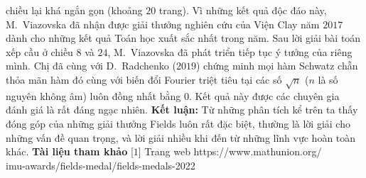 \begin{multicols}{2}
chiều lại khá ngắn gọn (khoảng $20$ trang). Vì những kết quả độc đáo này, M.~Viazovska đã nhận được giải thưởng nghiên cứu của Viện Clay năm $2017$ dành cho những kết quả Toán học xuất sắc nhất trong năm.        
	\vskip 0.05cm
	Sau lời giải bài toán xếp cầu ở chiều $8$ và $24$, M.~Viazovska đã phát triển tiếp tục ý tưởng của riêng mình. Chị đã cùng với D.~Radchenko ($2019$) chứng minh mọi hàm Schwatz chẵn thỏa mãn hàm đó cùng với biến đổi Fourier triệt tiêu tại các số $\sqrt{n}$ ($n$ là số nguyên không âm) luôn đồng nhất bằng $0$. Kết quả này được các chuyên gia đánh giá là rất đáng ngạc nhiên.
	\vskip 0.05cm
	{\bf\color{duongvaotoanhoc} Kết luận:}  Từ những phân tích kể trên ta thấy đóng góp của những giải thưởng Fields luôn rất đặc biệt, thường là lời giải cho những vấn đề quan trọng, và lời giải nhiều khi đến từ những lĩnh vực hoàn toàn khác.
	\vskip 0.05cm
	\textbf{\color{duongvaotoanhoc}Tài liệu tham khảo}
	\vskip 0.05cm
	[$1$] Trang web {\color{duongvaotoanhoc}https://www.mathunion.org/\\imu-awards/fields-medal/fields-medals-2022}
\end{multicols}
